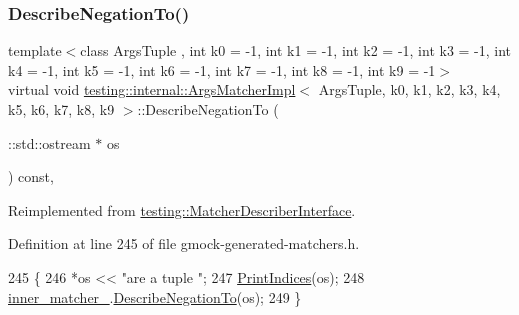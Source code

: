 \subsubsection{\texorpdfstring{Describe\+Negation\+To()}{DescribeNegationTo()}}
{\footnotesize\ttfamily template$<$class Args\+Tuple , int k0 = -\/1, int k1 = -\/1, int k2 = -\/1, int k3 = -\/1, int k4 = -\/1, int k5 = -\/1, int k6 = -\/1, int k7 = -\/1, int k8 = -\/1, int k9 = -\/1$>$ \\
virtual void \hyperlink{classtesting_1_1internal_1_1ArgsMatcherImpl}{testing\+::internal\+::\+Args\+Matcher\+Impl}$<$ Args\+Tuple, k0, k1, k2, k3, k4, k5, k6, k7, k8, k9 $>$\+::Describe\+Negation\+To (\begin{DoxyParamCaption}\item[{\+::std\+::ostream $\ast$}]{os }\end{DoxyParamCaption}) const\hspace{0.3cm}{\ttfamily [inline]}, {\ttfamily [virtual]}}



Reimplemented from \hyperlink{classtesting_1_1MatcherDescriberInterface_a2071afbc47097c4d1c0064275af34db0}{testing\+::\+Matcher\+Describer\+Interface}.



Definition at line 245 of file gmock-\/generated-\/matchers.\+h.


\begin{DoxyCode}
245                                                         \{
246     *os << \textcolor{stringliteral}{"are a tuple "};
247     \hyperlink{classtesting_1_1internal_1_1ArgsMatcherImpl_a2ea95d7970a1874c9616e42009ae53b0}{PrintIndices}(os);
248     \hyperlink{classtesting_1_1internal_1_1ArgsMatcherImpl_a719ba7e85d3381661021d699c9978ed0}{inner\_matcher\_}.\hyperlink{classtesting_1_1internal_1_1MatcherBase_ac1089d49b6b8a381900618985cd69b7f}{DescribeNegationTo}(os);
249   \}
\end{DoxyCode}
\mbox{\label{classtesting_1_1internal_1_1ArgsMatcherImpl_a8e057f67b368f7d94aeb0ddd35837c94}} 
